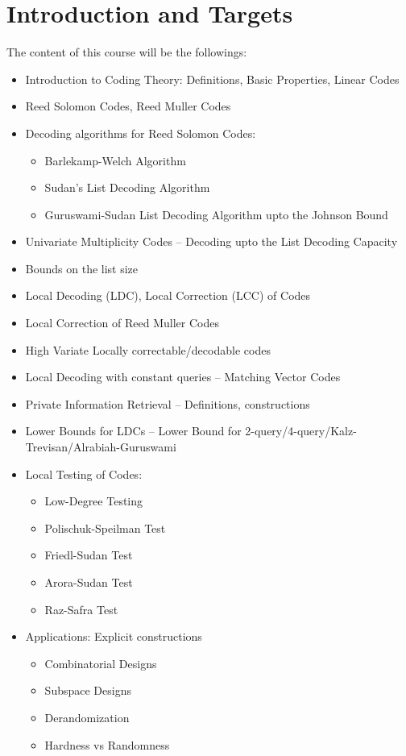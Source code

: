 \documentclass[twoside]{article}
\begin{document}
\section{Introduction and Targets}
The content of this course will be the followings:
\begin{itemize}[label=$\bullet$]
	\item Introduction to Coding Theory: Definitions, Basic Properties, Linear Codes
	\item Reed Solomon Codes, Reed Muller Codes
	\item Decoding algorithms for Reed Solomon Codes:\begin{itemize}
		\item Barlekamp-Welch Algorithm
		\item Sudan's List Decoding Algorithm
		\item Guruswami-Sudan List Decoding Algorithm upto the Johnson Bound
	\end{itemize}
	\item Univariate Multiplicity Codes -- Decoding upto the List Decoding Capacity
	\item Bounds on the list size 
	\item Local Decoding (LDC), Local Correction (LCC) of Codes 
	\item Local Correction of Reed Muller Codes
	\item High Variate Locally correctable/decodable codes
	\item Local Decoding with constant queries -- Matching Vector Codes
	\item Private Information Retrieval -- Definitions, constructions 
	\item Lower Bounds for LDCs -- Lower Bound for 2-query/4-query/Kalz-Trevisan/Alrabiah-Guruswami
	\item Local Testing of Codes:\begin{itemize}
		\item Low-Degree Testing
		\item Polischuk-Speilman Test 
		\item Friedl-Sudan Test 
		\item Arora-Sudan Test
		\item Raz-Safra Test
	\end{itemize}
	\item Applications: Explicit constructions\begin{itemize}
		\item Combinatorial Designs
		\item Subspace Designs
		\item Derandomization
		\item Hardness vs Randomness
	\end{itemize}
\end{itemize}





\newpage

% 
% 
\end{document}
